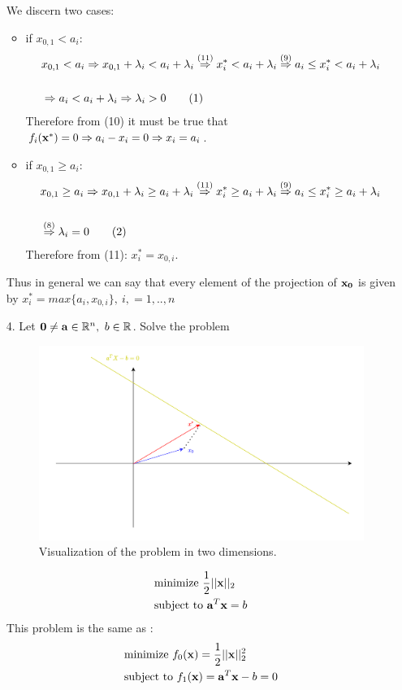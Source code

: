 \documentclass[12pt]{article}
\newcommand\numberthis{\addtocounter{equation}{1}\tag{\theequation}}
\begin{document}
\begin{enumerate}
		We discern two cases:
		\begin{itemize}
			\item
			if $x_{0,1}< a_i:$
			\begin{align*}
				&x_{0,1}< a_i\Rightarrow x_{0,1}+\lambda_i< a_i+\lambda_i \overset{(11)}{\Rightarrow} x^*_i < a_i+\lambda_i \overset{(9)}{\Rightarrow}a_i\leq x_i^* < a_i +\lambda_i\\
				\\
				&\Rightarrow a_i< a_i +\lambda_i \Rightarrow \lambda_i > 0 \numberthis
			\end{align*}
			Therefore from (10) it must be true that $f_i({\bf x^*})=0 \Rightarrow a_i-x_i=0 \Rightarrow x_i = a_i$.
			
			\item
			if $x_{0,1}\geq a_i:$
			\begin{align*}
				&x_{0,1}\geq a_i\Rightarrow x_{0,1}+\lambda_i\geq a_i+\lambda_i \overset{(11)}{\Rightarrow} x^*_i \geq a_i+\lambda_i \overset{(9)}{\Rightarrow}a_i\leq x_i^* \geq a_i +\lambda_i\\
				\\
				&\overset{(8)}{\Rightarrow} \lambda_i = 0 \numberthis
			\end{align*}
			Therefore from (11): $x^*_i=x_{0,i}$.
		\end{itemize}
		Thus in general we can say that every element of the projection of ${\bf x_0}$ is given by $x^*_i=max\{a_i,x_{0,i}\},\ i,=1,..,n$
		\newpage
		\item[4.]
		Let ${\bf 0}\ne {\bf a}\in \mathbb{R}^n,\ b\in \mathbb{R}$. Solve the problem
		\begin{figure}[h!]
			\begin{center}
				\includegraphics[width=1\linewidth]{4}
			\end{center}
			\caption{Visualization of the problem in two dimensions.}
		\end{figure}
		\begin{align*}
			&\text{minimize }\frac{1}{2}||{\bf x}||_2\\
			&\text{subject to }{\bf a}^T{\bf x}=b
		\end{align*}
		This problem is the same as :
		\begin{align*}
			&\text{minimize }f_0({\bf x})=\frac{1}{2}||{\bf x}||^2_2\\
			&\text{subject to }f_1({\bf x})={\bf a}^T{\bf x}-b=0 
		\end{align*}
		

\end{enumerate}
\end{document}
